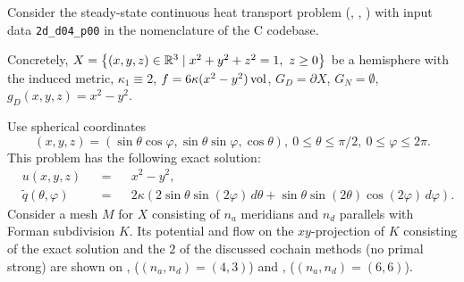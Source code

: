 \begin{example}
  \label{idec/diffusion/continuous/steady_state/examples/2d_d04_p00-example}
  Consider the steady-state continuous heat transport problem
  (,
   ,
   )
  with input data \verb|2d_d04_p00| in the nomenclature of the C codebase.

  Concretely,
    $X = \left\{ (x, y, z) \in \mathbb{R}^3 \mid x^2 + y^2 + z^2 = 1,\ z \geq 0 \right\}$ be a
      hemisphere with the induced metric,
    $\kappa_1 \equiv 2$,
    $f = 6 \kappa (x^2 - y^2) \mathop{\rm vol}\nolimits$,
    $G_D = \partial X$,
    $G_N = \emptyset$,
    $g_D(x, y, z) = x^2 - y^2$.

  Use spherical coordinates
  \begin{equation}
    (x, y, z)
    = (\sin \theta \cos \varphi, \sin \theta \sin \varphi, \cos \theta),\
    0 \leq \theta \leq \pi / 2,\
    0 \leq \varphi \leq 2 \pi.
  \end{equation}
  This problem has the following exact solution:
  \begin{subequations}
    \begin{alignat}{3}
      & u(x, y, z) && = && x^2 - y^2, \\
      & \tilde{q}(\theta, \varphi) &&
      = && 2 \kappa (2 \sin \theta \sin(2 \varphi)\, d \theta
                     + \sin \theta \sin(2 \theta) \cos (2 \varphi)\, d \varphi).
    \end{alignat}
  \end{subequations}
  Consider a mesh $M$ for $X$ consisting of $n_a$ meridians and $n_d$ parallels
  with Forman subdivision $K$.
  Its potential and flow on the $xy$-projection of $K$ consisting of the exact
  solution and the $2$ of the discussed cochain methods (no primal strong) are
  shown on
  ,
  ($(n_a, n_d) = (4, 3)$)
  and
  ,
  ($(n_a, n_d) = (6, 6)$).
\end{example}
